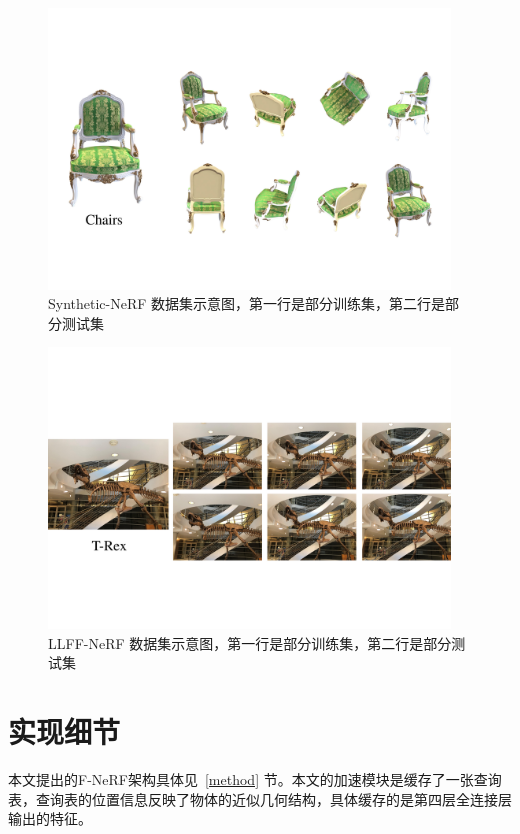 \begin{figure}[thbp]
    \centering
    \includegraphics[width=0.95\textwidth]{figures/Chairs.pdf}
    \caption{Synthetic-NeRF 数据集示意图，第一行是部分训练集，第二行是部分测试集}
    \label{fig:Chairs}
\end{figure}

\begin{figure}[thbp]
    \centering
    \includegraphics[width=0.95\textwidth]{figures/T-Rex.pdf}
    \caption{LLFF-NeRF 数据集示意图，第一行是部分训练集，第二行是部分测试集}
    \label{fig:T-Rex}
\end{figure}
\newpage

\section{实现细节}\label{details}
本文提出的F-NeRF架构具体见~\ref{method} 节。本文的加速模块是缓存了一张查询表，查询表的位置信息反映了物体的近似几何结构，具体缓存的是第四层全连接层输出的特征。

